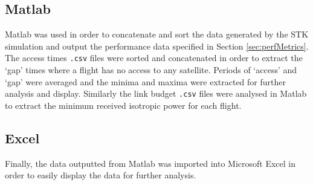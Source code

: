 \subsection{Matlab}
Matlab was used in order to concatenate and sort the data generated by the STK simulation and output the performance data specified in Section \ref{sec:perfMetrics}. The access times \Verb|.csv| files were sorted and concatenated in order to extract the `gap' times where a flight has no access to any satellite. Periods of `access' and `gap' were averaged and the minima and maxima were extracted for further analysis and display. Similarly the link budget \Verb|.csv| files were analysed in Matlab to extract the minimum received isotropic power for each flight.

\subsection{Excel}
Finally, the data outputted from Matlab was imported into Microsoft Excel in order to easily display the data for further analysis.